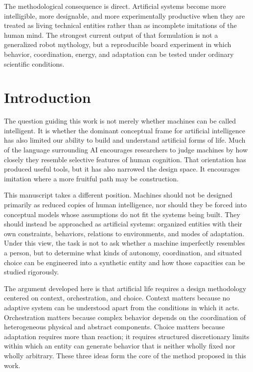 \documentclass[a4paper,english]{article}
\begin{document}
The methodological consequence is direct. Artificial systems become
more intelligible, more designable, and more experimentally productive
when they are treated as living technical entities rather than as
incomplete imitations of the human mind. The strongest current output
of that formulation is not a generalized robot mythology, but a reproducible
board experiment in which behavior, coordination, energy, and adaptation
can be tested under ordinary scientific conditions.


\section{Introduction}

The question guiding this work is not merely whether machines can
be called intelligent. It is whether the dominant conceptual frame
for artificial intelligence has also limited our ability to build
and understand artificial forms of life. Much of the language surrounding
AI encourages researchers to judge machines by how closely they resemble
selective features of human cognition. That orientation has produced
useful tools, but it has also narrowed the design space. It encourages
imitation where a more fruitful path may be construction.

This manuscript takes a different position. Machines should not be
designed primarily as reduced copies of human intelligence, nor should
they be forced into conceptual models whose assumptions do not fit
the systems being built. They should instead be approached as artificial
systems: organized entities with their own constraints, behaviors,
relations to environments, and modes of adaptation. Under this view,
the task is not to ask whether a machine
imperfectly resembles a person, but to determine what kinds of autonomy,
coordination, and situated choice can be engineered into a synthetic
entity and how those capacities can be studied rigorously.

The argument developed here is that artificial life requires a design
methodology centered on context, orchestration, and choice. Context
matters because no adaptive system can be understood apart from the
conditions in which it acts. Orchestration matters because complex
behavior depends on the coordination of heterogeneous physical and
abstract components. Choice matters because adaptation requires more
than reaction; it requires structured discretionary limits within
which an entity can generate behavior that is neither wholly fixed
nor wholly arbitrary. These three ideas form the core of the method
proposed in this work.
\end{document}
